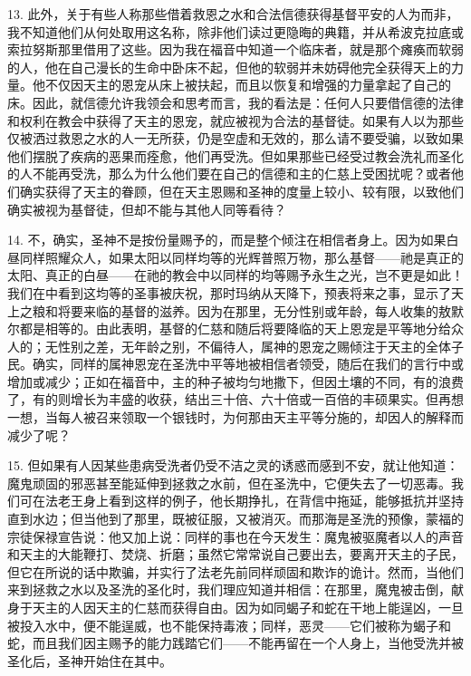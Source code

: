 13. 此外，关于有些人称那些借着救恩之水和合法信德获得基督平安的人为而非，我不知道他们从何处取用这名称，除非他们读过更隐晦的典籍，并从希波克拉底或索拉努斯那里借用了这些。因为我在福音中知道一个临床者，就是那个瘫痪而软弱的人，他在自己漫长的生命中卧床不起，但他的软弱并未妨碍他完全获得天上的力量。他不仅因天主的恩宠从床上被扶起，而且以恢复和增强的力量拿起了自己的床。因此，就信德允许我领会和思考而言，我的看法是：任何人只要借信德的法律和权利在教会中获得了天主的恩宠，就应被视为合法的基督徒。如果有人以为那些仅被洒过救恩之水的人一无所获，仍是空虚和无效的，那么请不要受骗，以致如果他们摆脱了疾病的恶果而痊愈，他们再受洗。但如果那些已经受过教会洗礼而圣化的人不能再受洗，那么为什么他们要在自己的信德和主的仁慈上受困扰呢？或者他们确实获得了天主的眷顾，但在天主恩赐和圣神的度量上较小、较有限，以致他们确实被视为基督徒，但却不能与其他人同等看待？\par

14. 不，确实，圣神不是按份量赐予的，而是整个倾注在相信者身上。因为如果白昼同样照耀众人，如果太阳以同样均等的光辉普照万物，那么基督——祂是真正的太阳、真正的白昼——在祂的教会中以同样的均等赐予永生之光，岂不更是如此！我们在中看到这均等的圣事被庆祝，那时玛纳从天降下，预表将来之事，显示了天上之粮和将要来临的基督的滋养。因为在那里，无分性别或年龄，每人收集的敖默尔都是相等的。由此表明，基督的仁慈和随后将要降临的天上恩宠是平等地分给众人的；无性别之差，无年龄之别，不偏待人，属神的恩宠之赐倾注于天主的全体子民。确实，同样的属神恩宠在圣洗中平等地被相信者领受，随后在我们的言行中或增加或减少；正如在福音中，主的种子被均匀地撒下，但因土壤的不同，有的浪费了，有的则增长为丰盛的收获，结出三十倍、六十倍或一百倍的丰硕果实。但再想一想，当每人被召来领取一个银钱时，为何那由天主平等分施的，却因人的解释而减少了呢？\par

15. 但如果有人因某些患病受洗者仍受不洁之灵的诱惑而感到不安，就让他知道：魔鬼顽固的邪恶甚至能延伸到拯救之水前，但在圣洗中，它便失去了一切恶毒。我们可在法老王身上看到这样的例子，他长期挣扎，在背信中拖延，能够抵抗并坚持直到水边；但当他到了那里，既被征服，又被消灭。而那海是圣洗的预像，蒙福的宗徒保禄宣告说：他又加上说：同样的事也在今天发生：魔鬼被驱魔者以人的声音和天主的大能鞭打、焚烧、折磨；虽然它常常说自己要出去，要离开天主的子民，但它在所说的话中欺骗，并实行了法老先前同样顽固和欺诈的诡计。然而，当他们来到拯救之水以及圣洗的圣化时，我们理应知道并相信：在那里，魔鬼被击倒，献身于天主的人因天主的仁慈而获得自由。因为如同蝎子和蛇在干地上能逞凶，一旦被投入水中，便不能逞威，也不能保持毒液；同样，恶灵——它们被称为蝎子和蛇，而且我们因主赐予的能力践踏它们——不能再留在一个人身上，当他受洗并被圣化后，圣神开始住在其中。\par

